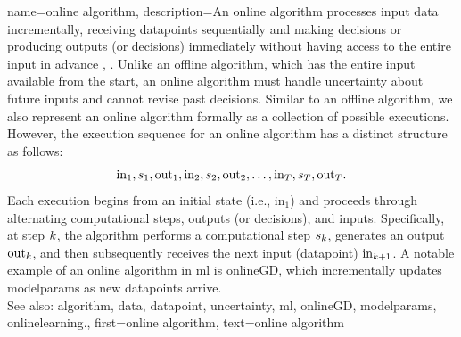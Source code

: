 {name={online algorithm},
	description={An online \gls{algorithm} processes input \gls{data} incrementally, 
		receiving \glspl{datapoint} sequentially and making decisions or producing outputs (or decisions) immediately 
		without having access to the entire input in advance \cite{PredictionLearningGames}, \cite{HazanOCO}. 
		Unlike an offline \gls{algorithm}, which has the entire input available from the start, an online \gls{algorithm} 
		must handle \gls{uncertainty} about future inputs and cannot revise past decisions. Similar to an 
		offline \gls{algorithm}, we also represent an online \gls{algorithm} formally as a collection of possible 
		executions. However, the execution sequence for an online \gls{algorithm} has a distinct structure as follows:
		$${\rm in}_{1}, s_1, {\rm out}_{1}, {\rm in}_{2}, s_2, {\rm out}_{2}, \ldots, {\rm in}_{T}, s_T, {\rm out}_{T}.$$ 
		Each execution begins from an initial state (i.e., \(\text{in}_{1}\)) and proceeds through alternating 
		computational steps, outputs (or decisions), and inputs. Specifically, at step \(k\), 
		the \gls{algorithm} performs a computational step \(s_{k}\), generates an output \(\text{out}_{k}\), 
		and then subsequently receives the next input (\gls{datapoint}) \(\text{in}_{k+1}\). A 
		notable example of an online \gls{algorithm} in \gls{ml} is \gls{onlineGD}, which incrementally 
		updates \gls{modelparams} as new \glspl{datapoint} arrive. 
					\\ 
		See also: \gls{algorithm}, \gls{data}, \gls{datapoint}, \gls{uncertainty}, \gls{ml}, \gls{onlineGD}, \gls{modelparams}, \gls{onlinelearning}.},
	first={online algorithm},
	text={online algorithm} 
}



